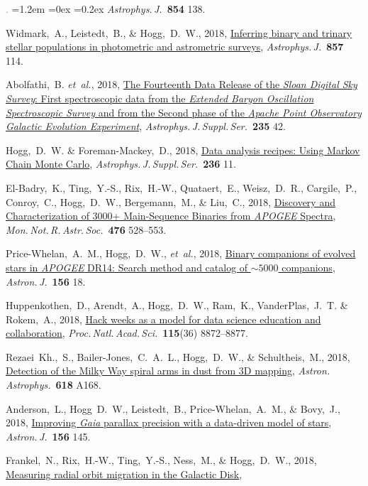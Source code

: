 \documentclass[10pt,letterpaper]{article}
\newcommand{\foreign}[1]{\textsl{#1}}
\newcommand{\etal}{\foreign{et~al.}}
\newcommand{\project}[1]{\textsl{#1}}
\newcommand{\doi}[2]{\href{http://dx.doi.org/#1}{{#2}}}
\newcommand{\deemph}[1]{\textcolor{grey}{\footnotesize{#1}}}
\newcommand{\pubnumber}[1]{\deemph{{#1}.}}
\newcounter{refpubnum}
\newcommand{\hogglist}{%
    \rightmargin=0in
    \leftmargin=1.2em
    \topsep=0ex
    \partopsep=0pt
    \itemsep=0.2ex
    \parsep=0pt
    \itemindent=-1.0\leftmargin
    \listparindent=0.0\leftmargin
    \settowidth{\labelsep}{~}
    \usecounter{refpubnum}
  }
\begin{document}
\begin{list}{\pubnumber{\therefpubnum}}{\hogglist}
\textit{Astrophys.\,J.}\ \textbf{854} 138.
\item
Widmark,~A., Leistedt,~B., \& Hogg,~D.~W., 2018,
\doi{10.3847/1538-4357/aab7ee}{Inferring binary and trinary stellar populations in photometric and astrometric surveys},
\textit{Astrophys.\,J.}\ \textbf{857} 114.
\item
Abolfathi,~B. \etal, 2018,
\doi{10.3847/1538-4365/aa9e8a}{The Fourteenth Data Release of the \project{Sloan Digital Sky Survey}: First spectroscopic data from the \project{Extended Baryon Oscillation Spectroscopic Survey} and from the Second phase of the \project{Apache Point Observatory Galactic Evolution Experiment}},
\textit{Astrophys.\,J.\,Suppl.\,Ser.}\ \textbf{235} 42.
\item
Hogg,~D.~W. \& Foreman-Mackey,~D., 2018,
\doi{10.3847/1538-4365/aab76e}{Data analysis recipes: Using Markov Chain Monte Carlo},
\textit{Astrophys.\,J.\,Suppl.\,Ser.}\ \textbf{236} 11.
\item
El-Badry,~K., Ting,~Y.-S., Rix,~H.-W., Quataert,~E., Weisz,~D.~R., Cargile,~P., Conroy,~C., Hogg,~D.~W., Bergemann,~M., \& Liu,~C., 2018,
\doi{10.1093/mnras/sty240}{Discovery and Characterization of 3000+ Main-Sequence Binaries from \project{APOGEE} Spectra},
\textit{Mon.\,Not.\,R.\,Astr.\,Soc.}\ \textbf{476} 528--553.
\item
Price-Whelan,~A.~M., Hogg,~D.~W., \etal, 2018,
\doi{10.3847/1538-3881/aac387}{Binary companions of evolved stars in \project{APOGEE} DR14: Search method and catalog of $\sim5000$ companions},
\textit{Astron.\,J.}\ \textbf{156} 18.
\item
Huppenkothen,~D., Arendt,~A., Hogg,~D.~W., Ram,~K., VanderPlas,~J.~T. \& Rokem,~A., 2018,
\doi{10.1073/pnas.1717196115}{Hack weeks as a model for data science education and collaboration},
\textit{Proc.\,Natl.\,Acad.\,Sci.}\ \textbf{115}(36) 8872--8877.
\item
Rezaei~Kh.,~S., Bailer-Jones,~C.~A.~L., Hogg,~D.~W., \& Schultheis,~M., 2018,
\doi{10.1051/0004-6361/201833284}{Detection of the Milky Way spiral arms in dust from 3D mapping},
\textit{Astron.\,Astrophys.}\ \textbf{618} A168.
\item
Anderson,~L., Hogg~D.~W., Leistedt,~B., Price-Whelan,~A.~M., \& Bovy,~J., 2018,
\doi{10.3847/1538-3881/aad7bf}{Improving \project{Gaia} parallax precision with a data-driven model of stars},
\textit{Astron.\,J.}\ \textbf{156} 145.
\item
Frankel,~N., Rix,~H.-W., Ting,~Y.-S., Ness,~M., \& Hogg,~D.~W., 2018,
\doi{10.3847/1538-4357/aadba5}{Measuring radial orbit migration in the Galactic Disk},

\end{list}
\end{document}
